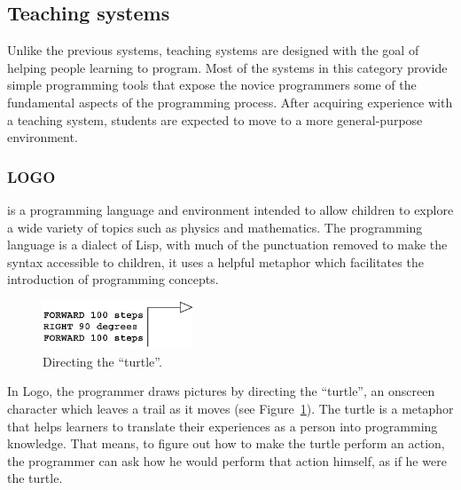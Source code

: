 \subsection{Teaching systems}
\label{sec:ts}

Unlike the previous systems, teaching systems are designed with the goal of helping people learning to program. Most of the systems in this category provide simple programming tools that expose the novice programmers some of the fundamental aspects of the programming process. After acquiring experience with a teaching system, students are expected to move to a more general-purpose environment. 

\subsubsection{LOGO~\cite{papert1980mindstorms}} is a programming language and environment intended to allow children to explore a wide variety of topics such as physics and mathematics. The programming language is a dialect of Lisp, with much of the punctuation removed to make the syntax accessible to children, it uses a helpful metaphor which facilitates the introduction of programming concepts.

\begin{figure}
  \vspace{-25pt}
  \begin{center}
    \includegraphics[width=0.4\textwidth]{img/turtle}
  \end{center}
  \vspace{-15pt}
 \caption{Directing the ``turtle''.}  
  \vspace{-20pt}
    \label{fig:turtle}
\end{figure}

In Logo, the programmer draws pictures by directing the ``turtle'', an onscreen character which leaves a trail as it moves (see Figure~\ref{fig:turtle}). The turtle is a metaphor that helps learners to translate their experiences as a person into programming knowledge. That means, to figure out how to make the turtle perform an action, the programmer can ask how he would perform that action himself, as if he were the turtle.

